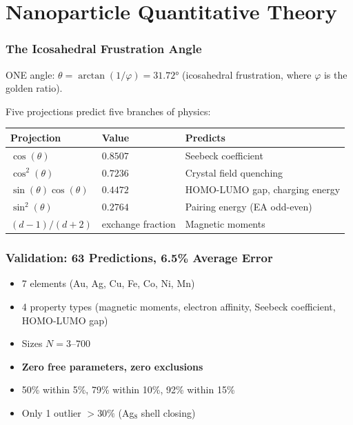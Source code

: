 \documentclass[11pt, a4paper]{article}
\begin{document}
\newpage

\part{Nanoparticle Quantitative Theory}

\section{The Icosahedral Frustration Angle}

ONE angle: $\theta = \arctan(1/\varphi) = 31.72°$ (icosahedral
frustration, where $\varphi$ is the golden ratio).

Five projections predict five branches of physics:

\begin{center}
\begin{tabular}{@{}lll@{}}
\toprule
\textbf{Projection} & \textbf{Value} & \textbf{Predicts} \\
\midrule
$\cos(\theta)$ & $0.8507$ & Seebeck coefficient \\
$\cos^2(\theta)$ & $0.7236$ & Crystal field quenching \\
$\sin(\theta)\cos(\theta)$ & $0.4472$ & HOMO-LUMO gap, charging energy \\
$\sin^2(\theta)$ & $0.2764$ & Pairing energy (EA odd-even) \\
$(d-1)/(d+2)$ & exchange fraction & Magnetic moments \\
\bottomrule
\end{tabular}
\end{center}

\section{Validation: 63 Predictions, 6.5\% Average Error}

\begin{itemize}[nosep]
  \item 7 elements (Au, Ag, Cu, Fe, Co, Ni, Mn)
  \item 4 property types (magnetic moments, electron affinity,
        Seebeck coefficient, HOMO-LUMO gap)
  \item Sizes $N = 3$--$700$
  \item \textbf{Zero free parameters, zero exclusions}
  \item 50\% within 5\%, 79\% within 10\%, 92\% within 15\%
  \item Only 1 outlier $> 30\%$ (Ag$_8$ shell closing)
\end{itemize}
\end{document}
